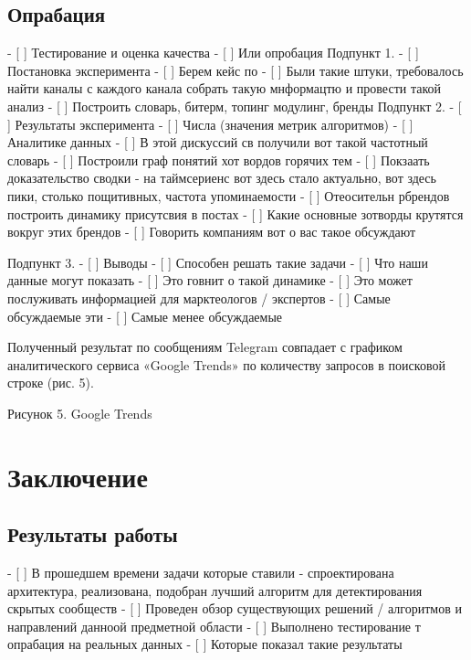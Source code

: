 \documentclass[a4paper,article,14pt]{extarticle}
\begin{document}
\subsection{Опрабация}

    - [ ] Тестирование и оценка качества
    - [ ] Или опробация
Подпункт 1.
    - [ ] Постановка эксперимента
    - [ ] Берем кейс по
    - [ ] Были такие штуки, требовалось найти каналы с каждого канала собрать такую мнформацтю и провести такой анализ
    - [ ] Построить словарь, битерм, топинг модулинг, бренды
Подпункт 2.
    - [ ] Результаты эксперимента
    - [ ] Числа (значения метрик алгоритмов)
    - [ ] Аналитике данных
    - [ ] В этой дискуссий св получили вот такой частотный словарь
    - [ ] Построили граф понятий хот вордов горячих тем
    - [ ] Покзаать доказательство сводки - на таймсериенс вот здесь стало актуально, вот здесь пики, столько пощитивных, частота упоминаемости
    - [ ] Отеосительн рбрендов построить динамику присутсвия в постах
    - [ ] Какие основные зотворды крутятся вокруг этих брендов
    - [ ] Говорить компаниям вот о вас такое обсуждают

Подпункт 3.
    - [ ] Выводы
    - [ ] Способен решать такие задачи
    - [ ] Что наши данные могут показать
    - [ ] Это говнит о такой динамике
    - [ ] Это может послуживать информацией для марктеологов / экспертов
    - [ ] Самые обсуждаемые эти
    - [ ] Самые менее обсуждаемые



Полученный результат по сообщениям Telegram совпадает с графиком аналитического сервиса «Google Trends» по количеству запросов в поисковой строке (рис. 5).


Рисунок 5. Google Trends

\section{Заключение}
\subsection{Результаты работы}

      - [ ] В прошедшем времени задачи которые ставили - спроектирована архитектура, реализована, подобран лучший алгоритм для детектирования скрытых сообществ
        - [ ] Проведен обзор существующих решений / алгоритмов и направлений данноой предметной области
        - [ ] Выполнено тестирование т опрабация на реальных данных
        - [ ] Которые показал такие результаты
\end{document}
